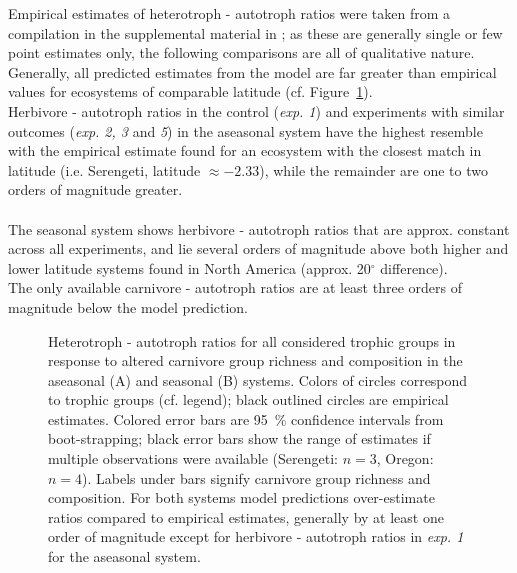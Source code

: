 Empirical estimates of heterotroph - autotroph ratios were taken from a compilation in the supplemental material in \cite{Harfoot2014}; as these are generally single or few point estimates only, the following comparisons are all of qualitative nature. Generally, all predicted estimates from the model are far greater than empirical values for ecosystems of comparable latitude (cf. Figure~\ref{fig:chap:res:dyn:ratios}). \\
Herbivore - autotroph ratios in the control (\textit{exp. 1}) and experiments with similar outcomes (\textit{exp. 2, 3} and \textit{5}) in the aseasonal system have the highest resemble with the empirical estimate found for an ecosystem with the closest match in latitude (i.e. Serengeti, latitude $  \approx -2.33$), while the remainder are one to two orders of magnitude greater. \\\\
The seasonal system shows herbivore - autotroph ratios that are approx. constant across all experiments, and lie several orders of magnitude above both higher and lower latitude  systems found in North America (approx. 20$^\circ$ difference). \\ 
The only available carnivore - autotroph ratios are at least three orders of magnitude below the model prediction.
\begin{figure}[htb!]
\centering

\caption[Comparison to empirical data]{Heterotroph - autotroph ratios for all considered trophic groups in response to altered carnivore group richness and composition in the aseasonal (A) and seasonal (B) systems. Colors of circles correspond to trophic groups (cf. legend); black outlined circles are empirical estimates. Colored error bars are 95~\% confidence intervals from boot-strapping; black error bars show the range of estimates if multiple observations were available (Serengeti: $n = 3$, Oregon: $n = 4$). Labels under bars signify carnivore group richness and composition. For both systems model predictions over-estimate ratios compared to empirical estimates, generally  by at least one order of magnitude except for herbivore - autotroph ratios in \textit{exp. 1} for the aseasonal system.}
\label{fig:chap:res:dyn:ratios}
\end{figure}



%
